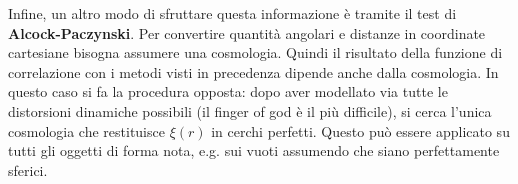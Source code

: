 \vspace{1em}
Infine, un altro modo di sfruttare questa informazione è tramite il test di \textbf{Alcock-Paczynski}. Per convertire quantità angolari e distanze in coordinate cartesiane bisogna assumere una cosmologia. Quindi il risultato della funzione di correlazione con i metodi visti in precedenza dipende anche dalla cosmologia. In questo caso si fa la procedura opposta: dopo aver modellato via tutte le distorsioni dinamiche possibili (il finger of god è il più difficile), si cerca l'unica cosmologia che restituisce $\xi (r)$ in cerchi perfetti. Questo può essere applicato su tutti gli oggetti di forma nota, e.g. sui vuoti assumendo che siano perfettamente sferici.
